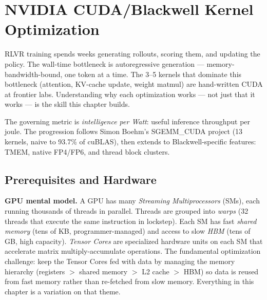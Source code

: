 \section{NVIDIA CUDA/Blackwell Kernel Optimization}

\smallskip

\begin{whythis}
RLVR training spends weeks generating rollouts, scoring them, and updating the policy. The wall-time bottleneck is autoregressive generation --- memory-bandwidth-bound, one token at a time. The 3--5 kernels that dominate this bottleneck (attention, KV-cache update, weight matmul) are hand-written CUDA at frontier labs. Understanding why each optimization works --- not just that it works --- is the skill this chapter builds.

The governing metric is \textit{intelligence per Watt}: useful inference throughput per joule. The progression follows Simon Boehm's SGEMM\_CUDA project (13 kernels, naive to 93.7\% of cuBLAS), then extends to Blackwell-specific features: TMEM, native FP4/FP6, and thread block clusters.
\end{whythis}

\subsection{Prerequisites and Hardware}

\textbf{GPU mental model.} A GPU has many \textit{Streaming Multiprocessors} (SMs), each running thousands of threads in parallel. Threads are grouped into \textit{warps} (32 threads that execute the same instruction in lockstep). Each SM has fast \textit{shared memory} (tens of KB, programmer-managed) and access to slow \textit{HBM} (tens of GB, high capacity). \textit{Tensor Cores} are specialized hardware units on each SM that accelerate matrix multiply-accumulate operations. The fundamental optimization challenge: keep the Tensor Cores fed with data by managing the memory hierarchy (registers $>$ shared memory $>$ L2 cache $>$ HBM) so data is reused from fast memory rather than re-fetched from slow memory. Everything in this chapter is a variation on that theme.

